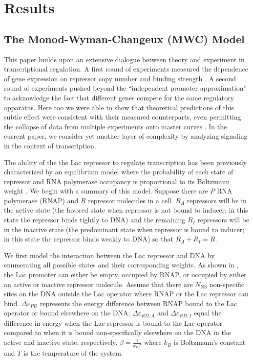 \pagebreak
\section*{Results}

\subsection*{The Monod-Wyman-Changeux (MWC) Model } 

This paper builds upon an extensive dialogue between theory and experiment in
transcriptional regulation. A first round of experiments measured the dependence
of gene expression on repressor copy number and binding strength
\cite{Garcia2011}. A second round of experiments pushed beyond the ``independent
promoter approximation'' to acknowledge the fact that different genes compete
for the same regulatory apparatus. Here too we were able to show that
theoretical predictions of this subtle effect were consistent with their
measured counterparts, even permitting the collapse of data from multiple
experiments onto master curves \cite{Brewster2014, Weinert2014}. In the current
paper, we consider yet another layer of complexity by analyzing signaling in the
context of transcription.

The ability of the the Lac repressor to regulate transcription has been
previously characterized by an equilibrium model where the probability of each
state of repressor and RNA polymerase occupancy is proportional to its Boltzmann
weight \cite{Daber2011a, Phillips2015a}. We begin with a summary of this model.
Suppose there are \(P\) RNA polymerase (RNAP) and \(R\) repressor molecules in a
cell. \(R_A\) repressors will be in the active state (the favored state when
repressor is not bound to inducer; in this state the repressor binds tightly to
DNA) and the remaining \(R_I\) repressors will be in the inactive state (the
predominant state when repressor is bound to inducer; in this state the
repressor binds weakly to DNA) so that \(R_A+R_I=R\).

We first model the interaction between the Lac repressor and DNA by enumerating
all possible states and their corresponding weights. As shown in
\fref[figpolymeraseRepressorStates], the Lac promoter can either be empty,
occupied by RNAP, or occupied by either an active or inactive repressor
molecule. Assume that there are $N_{\text{NS}}$ non-specific sites on the DNA outside
the Lac operator where RNAP or the Lac repressor can bind. \(\Delta\varepsilon_{PD}\)
represents the energy difference between RNAP bound to the Lac operator or bound
elsewhere on the DNA; \(\Delta\varepsilon_{RD,A}\) and \(\Delta\varepsilon_{RD,I}\) equal the
difference in energy when the Lac repressor is bound to the Lac operator
compared to when it is bound non-specifically elsewhere on the DNA in the active
and inactive state, respectively. $\beta = \frac{1}{k_BT}$ where $k_B$ is
Boltzmann's constant and $T$ is the temperature of the system.

